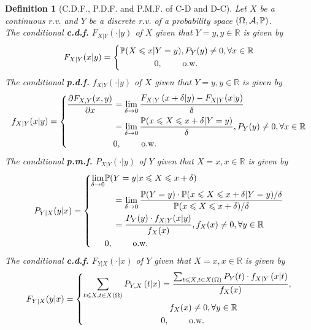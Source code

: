 \documentclass[openany,12pt]{book}
\newtheorem{definition}{Definition}[chapter]
\begin{document}
\begin{definition}[C.D.F., P.D.F. and P.M.F. of C-D and D-C]
  Let $X$ be a continuous r.v. and $Y$ be a discrete r.v. of a probability space $(\Omega,\mathcal{A},\mathbb{P})$.\\
  The conditional \textbf{c.d.f.} $F_{X|Y}\left( \cdot | y \right)$ of $X$ given that $Y = y, y \in \mathbb{R}$ is given by
  \[
    F_{X|Y}(x|y)= \left\{ \begin{aligned}
       & \mathbb{P}(X \leqslant x | Y = y),P_{Y}(y) \neq 0,\forall x \in \mathbb{R} \\
       & \qquad\qquad0,\qquad~\text{o.w.}~  \\
    \end{aligned} \right. 
  \]
  The conditional \textbf{p.d.f.} $f_{X|Y}\left( \cdot | y \right)$ of $X$ given that $Y = y, y \in \mathbb{R}$ is given by
  \[
    f_{X|Y}(x|y)= \left\{ \begin{aligned}
      \frac{\partial F_{X,Y}(x,y)}{\partial x} & = \lim_{\delta \to 0}\frac{F_{X|Y}\left( x + \delta | y \right) - F_{X|Y}(x|y)}{\delta} \\
      & = \lim_{\delta \to 0}\frac{\mathbb{P}( x \leqslant X \leqslant x + \delta | Y = y)}{\delta},P_{Y}(y) \neq 0,\forall x \in \mathbb{R} \\
      & 0,\qquad~\text{o.w.}~ \\
    \end{aligned} \right. 
  \]
  The conditional \textbf{p.m.f.} $P_{X|Y}\left( \cdot | y \right)$ of $Y$ given that $X = x,x \in \mathbb{R}$ is given by
  \[
    P_{Y|X}(y|x)
    =\left\{\begin{aligned}
      \lim_{\delta \to 0} & \mathbb{P}( Y = y | x \leqslant X \leqslant x + \delta) \\
      & \quad= \lim_{\delta \to 0}\frac{\mathbb{P}(Y = y) \cdot \mathbb{P}( x \leqslant X \leqslant x + \delta | Y = y)/\delta}{\mathbb{P}(x \leqslant X \leqslant x + \delta)/\delta} \\
      & \quad= \frac{P_{Y}(y) \cdot f_{X|Y}(x|y)}{f_{X}(x)},f_{X}(x) \neq 0,\forall y \in \mathbb{R} \\
      & 0, \qquad~\text{o.w.}~ \\
    \end{aligned}\right. 
  \]
  The conditional \textbf{c.d.f.} $F_{Y|X}\left( \cdot | x \right)$ of $Y$ given that $X = x,x \in \mathbb{R}$ is given by
  \[F_{Y|X}(y|x)= \left\{ \begin{aligned}
      \sum_{t \leqslant X, t \in X(\Omega) }^{}{P_{Y,X}\left( t|x \right)} & = \frac{\sum_{t \leqslant X, t \in X(\Omega)}^{}{P_{Y}(t) \cdot f_{X|Y}\left( x | t \right)}}{f_{X}(x)}, \\
                                                                     & \quad f_{X}(x) \neq 0,\forall y \in \mathbb{R}                                                     \\
                                                                     & 0, \qquad~\text{o.w.}~                                                                             \\
    \end{aligned} \right. \]
\end{definition}
\end{document}
